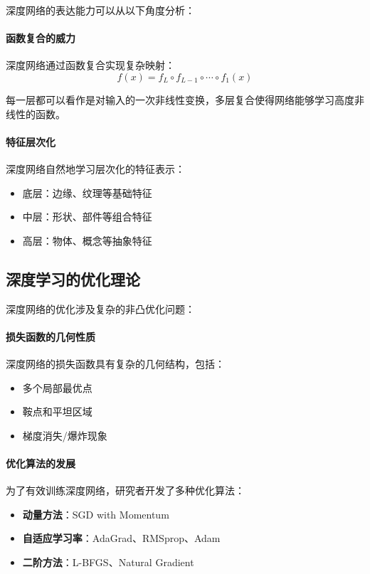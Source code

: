 深度网络的表达能力可以从以下角度分析：

\paragraph{函数复合的威力}
深度网络通过函数复合实现复杂映射：
\begin{equation}
f(x) = f_L \circ f_{L-1} \circ \cdots \circ f_1(x)
\end{equation}

每一层都可以看作是对输入的一次非线性变换，多层复合使得网络能够学习高度非线性的函数。

\paragraph{特征层次化}
深度网络自然地学习层次化的特征表示：
\begin{itemize}
\item 底层：边缘、纹理等基础特征
\item 中层：形状、部件等组合特征
\item 高层：物体、概念等抽象特征
\end{itemize}

\subsection{深度学习的优化理论}

深度网络的优化涉及复杂的非凸优化问题：

\paragraph{损失函数的几何性质}
深度网络的损失函数具有复杂的几何结构，包括：
\begin{itemize}
\item 多个局部最优点
\item 鞍点和平坦区域
\item 梯度消失/爆炸现象
\end{itemize}

\paragraph{优化算法的发展}
为了有效训练深度网络，研究者开发了多种优化算法：
\begin{itemize}
\item {\bf 动量方法}：SGD with Momentum
\item {\bf 自适应学习率}：AdaGrad、RMSprop、Adam
\item {\bf 二阶方法}：L-BFGS、Natural Gradient
\end{itemize}

